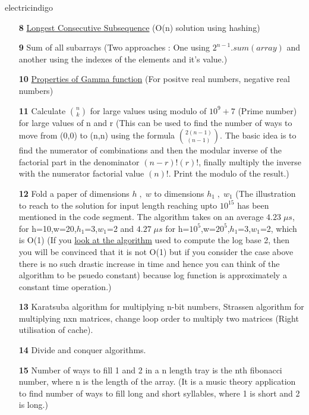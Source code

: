 \documentclass[12pt]{article}
\begin{document}
\begin{mybox}{electricindigo}{}
	\begin{itemize}
		\item[\textbf{8}] \href{https://www.geeksforgeeks.org/longest-consecutive-subsequence/}{Longest Consecutive Subsequence} (O(n) solution using hashing)
		\item[\textbf{9}] Sum of all subarrays (Two approaches : One using $2^{n-1}.sum(array)$ and another using the indexes of the elements and it's value.)
		\item[\textbf{10}] \href{http://www.jekyll.math.byuh.edu/courses/m321/handouts/gammaproperties.pdf}{Properties of Gamma function} (For positve real numbers, negative real numbers)
		\item[\textbf{11}] Calculate $n \choose k$ for large values using modulo of $10^9+7$ (Prime number) for large values of n and r (This can be used to find the number of ways to move from (0,0) to (n,n) using the formula $2(n-1) \choose (n-1)$. The basic idea is to find the numerator of combinations and then the modular inverse of the factorial part in the denominator $(n-r)!(r)!$, finally multiply the inverse with the numerator factorial value $(n)!$. Print the modulo of the result.)
		\item[\textbf{12}] Fold a paper of dimensions $h\;,\;w$ to dimensions $h_1\;,\;w_1$ (The illustration to reach to the solution for input length reaching upto $10^{15}$ has been mentioned in the code segment. The algorithm takes on an average $4.23\;{\mu}s$, for h=10,w=20,$h_1$=3,$w_1$=2 and $4.27\;{\mu}s$ for h=$10^5$,w=$20^5$,$h_1$=$3$,$w_1$=2, which is O(1) (If you \href{https://en.wikipedia.org/wiki/Binary_logarithm#Iterative_approximation}{look at the algorithm} used to compute the log base 2, then you will be convinced that it is not O(1) but if you consider the case above there is no such drastic increase in time and hence you can think of the algorithm to be psuedo constant) because log function is approximately a constant time operation.)
		\item[\textbf{13}] Karatsuba algorithm for multiplying n-bit numbers, Strassen algorithm for multiplying nxn matrices, change loop order to multiply two matrices (Right utilisation of cache).
		\item[\textbf{14}] Divide and conquer algorithms.
		\item[\textbf{15}] Number of ways to fill 1 and 2 in a n length tray is the nth fibonacci number, where n is the length of the array. (It is a music theory application to find number of ways to fill long and short syllables, where 1 is short and 2 is long.)
	\end{itemize}
\end{mybox}

	

		
		
\end{document}
